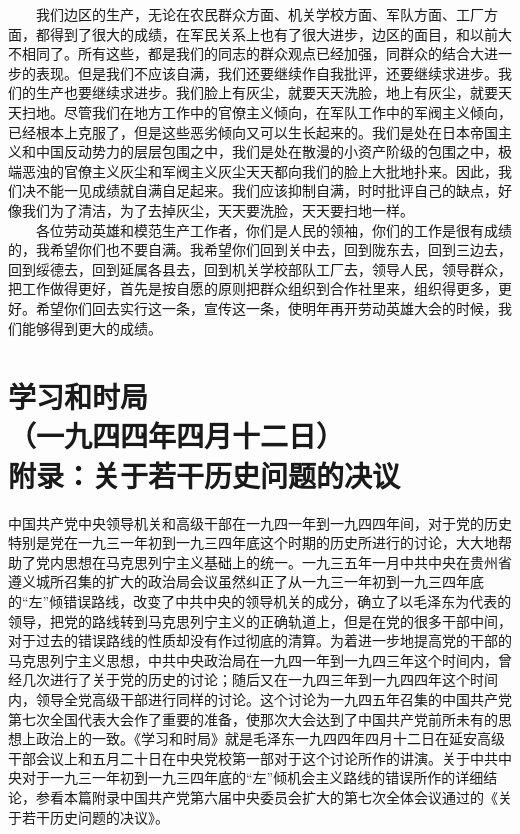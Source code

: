 \documentclass[cn,11pt,chinese]{elegantbook}
\def\myformat#1{\hfil\hfil #1}
\begin{document}
　　我们边区的生产，无论在农民群众方面、机关学校方面、军队方面、工厂方面，都得到了很大的成绩，在军民关系上也有了很大进步，边区的面目，和以前大不相同了。所有这些，都是我们的同志的群众观点已经加强，同群众的结合大进一步的表现。但是我们不应该自满，我们还要继续作自我批评，还要继续求进步。我们的生产也要继续求进步。我们脸上有灰尘，就要天天洗脸，地上有灰尘，就要天天扫地。尽管我们在地方工作中的官僚主义倾向，在军队工作中的军阀主义倾向，已经根本上克服了，但是这些恶劣倾向又可以生长起来的。我们是处在日本帝国主义和中国反动势力的层层包围之中，我们是处在散漫的小资产阶级的包围之中，极端恶浊的官僚主义灰尘和军阀主义灰尘天天都向我们的脸上大批地扑来。因此，我们决不能一见成绩就自满自足起来。我们应该抑制自满，时时批评自己的缺点，好像我们为了清洁，为了去掉灰尘，天天要洗脸，天天要扫地一样。\\
　　各位劳动英雄和模范生产工作者，你们是人民的领袖，你们的工作是很有成绩的，我希望你们也不要自满。我希望你们回到关中去，回到陇东去，回到三边去，回到绥德去，回到延属各县去，回到机关学校部队工厂去，领导人民，领导群众，把工作做得更好，首先是按自愿的原则把群众组织到合作社里来，组织得更多，更好。希望你们回去实行这一条，宣传这一条，使明年再开劳动英雄大会的时候，我们能够得到更大的成绩。\\
\newpage\section*{\myformat{学习和时局}\\\myformat{（一九四四年四月十二日）}\\\myformat{附录：关于若干历史问题的决议}}
\begin{introduction}\item  中国共产党中央领导机关和高级干部在一九四一年到一九四四年间，对于党的历史特别是党在一九三一年初到一九三四年底这个时期的历史所进行的讨论，大大地帮助了党内思想在马克思列宁主义基础上的统一。一九三五年一月中共中央在贵州省遵义城所召集的扩大的政治局会议虽然纠正了从一九三一年初到一九三四年底的“左”倾错误路线，改变了中共中央的领导机关的成分，确立了以毛泽东为代表的领导，把党的路线转到马克思列宁主义的正确轨道上，但是在党的很多干部中间，对于过去的错误路线的性质却没有作过彻底的清算。为着进一步地提高党的干部的马克思列宁主义思想，中共中央政治局在一九四一年到一九四三年这个时间内，曾经几次进行了关于党的历史的讨论；随后又在一九四三年到一九四四年这个时间内，领导全党高级干部进行同样的讨论。这个讨论为一九四五年召集的中国共产党第七次全国代表大会作了重要的准备，使那次大会达到了中国共产党前所未有的思想上政治上的一致。《学习和时局》就是毛泽东一九四四年四月十二日在延安高级干部会议上和五月二十日在中央党校第一部对于这个讨论所作的讲演。关于中共中央对于一九三一年初到一九三四年底的“左”倾机会主义路线的错误所作的详细结论，参看本篇附录中国共产党第六届中央委员会扩大的第七次全体会议通过的《关于若干历史问题的决议》。 \end{introduction}
\end{document}
